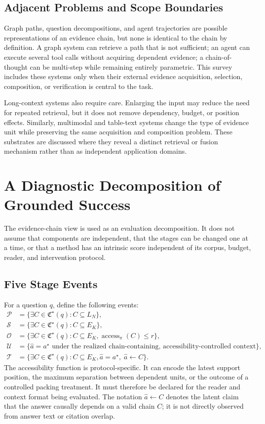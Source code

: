 \documentclass[manuscript,review]{acmart}
\newcommand{\obs}{\ensuremath{\mathcal{P}}}
\newcommand{\sel}{\ensuremath{\mathcal{S}}}
\newcommand{\expo}{\ensuremath{\mathcal{O}}}
\newcommand{\fus}{\ensuremath{\mathcal{U}}}
\newcommand{\faith}{\ensuremath{\mathcal{T}}}
\newcommand{\chainset}{\ensuremath{\mathfrak{C}}}
\theoremstyle{definition}
\theoremstyle{plain}
\theoremstyle{remark}
\begin{document}
\subsection{Adjacent Problems and Scope Boundaries}

Graph paths, question decompositions, and agent trajectories are possible
representations of an evidence chain, but none is identical to the chain by
definition. A graph system can retrieve a path that is not sufficient; an
agent can execute several tool calls without acquiring dependent evidence; a
chain-of-thought can be multi-step while remaining entirely parametric. This
survey includes these systems only when their external evidence acquisition,
selection, composition, or verification is central to the task.

Long-context systems also require care. Enlarging the input may reduce the
need for repeated retrieval, but it does not remove dependency, budget, or
position effects. Similarly, multimodal and table-text systems change the
type of evidence unit while preserving the same acquisition and composition
problem. These substrates are discussed where they reveal a distinct
retrieval or fusion mechanism rather than as independent application domains.
\section{A Diagnostic Decomposition of Grounded Success}
\label{sec:stat_decomposition}

The evidence-chain view is used as an evaluation decomposition. It does not
assume that components are independent, that the stages can be changed one at
a time, or that a method has an intrinsic score independent of its corpus,
budget, reader, and intervention protocol.

\subsection{Five Stage Events}

For a question $q$, define the following events:
\begin{align}
\obs &= \{\exists C\in\chainset^\star(q): C\subseteq L_N\}, \\
\sel &= \{\exists C\in\chainset^\star(q): C\subseteq E_K\}, \\
\expo &= \{\exists C\in\chainset^\star(q): C\subseteq E_K,
          \operatorname{access}_{\pi}(C)\le r\}, \\
\fus &= \{\hat a=a^\star \text{ under the realized chain-containing,
          accessibility-controlled context}\}, \\
\faith &= \{\exists C\in\chainset^\star(q): C\subseteq E_K,
          \hat a=a^\star,\; \hat a\leftarrow C\}.
\end{align}
The accessibility function is protocol-specific. It can encode the latest
support position, the maximum separation between dependent units, or the
outcome of a controlled packing treatment. It must therefore be declared for
the reader and context format being evaluated. The notation
$\hat a\leftarrow C$ denotes the latent claim that the answer causally depends
on a valid chain $C$; it is not directly observed from answer text or citation
overlap.
\end{document}
